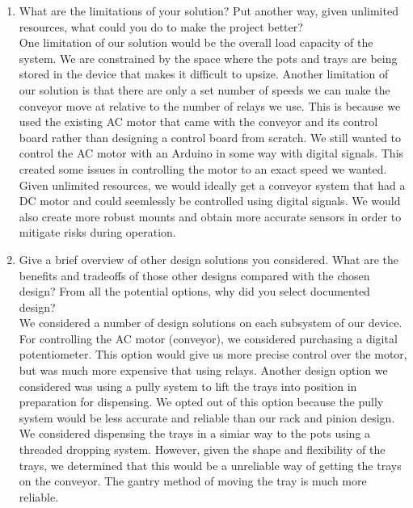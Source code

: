 \documentclass[12pt, titlepage]{article}
\begin{document}
\begin{enumerate}
  \item What are the limitations of your solution?  Put another way, given
  unlimited resources, what could you do to make the project better?\\

  One limitation of our solution would be the overall load capacity of the system.
  We are constrained by the space where the pots and trays are being stored in the device
  that makes it difficult to upsize. Another limitation of our solution is that there are only
  a set number of speeds we can make the conveyor move at relative to the number of relays we use.
  This is because we used the existing AC motor that came with the conveyor and its control board rather than
  designing a control board from scratch. We still wanted to control the AC motor with an Arduino in some way with digital signals.
  This created some issues in controlling the motor to an exact speed we wanted. Given unlimited resources,
  we would ideally get a conveyor system that had a DC motor and could seemlessly be controlled using 
  digital signals. We would also create more robust mounts and obtain more accurate sensors in order to mitigate risks
  during operation.
  

  \item Give a brief overview of other design solutions you considered.  What
  are the benefits and tradeoffs of those other designs compared with the chosen
  design?  From all the potential options, why did you select documented design?\\
  
  We considered a number of design solutions on each subsystem of our device. For controlling the AC motor (conveyor),
  we considered purchasing a digital potentiometer. This option would give us more precise control over the motor, 
  but was much more expensive that using relays. Another design option we considered was using a pully system to lift the 
  trays into position in preparation for dispensing. We opted out of this option because the pully system would be less accurate and reliable
  than our rack and pinion design. We considered dispensing the trays in a simiar way to the pots using a threaded dropping system. However,
  given the shape and flexibility of the trays, we determined that this would be a unreliable way of getting the trays on the conveyor. The 
  gantry method of moving the tray is much more reliable.
\end{enumerate}
\end{document}
